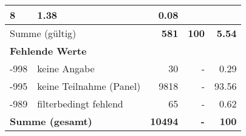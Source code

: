 \begin{longtable}{lXrrr}
       \num{8} &
       \num[round-mode=places,round-precision=2]{1,38} &
         \num[round-mode=places,round-precision=2]{0,08} \\
     \midrule
     \multicolumn{2}{l}{Summe (gültig)} &
       \textbf{\num{581}} &
     \textbf{100} &
       \textbf{\num[round-mode=places,round-precision=2]{5,54}} \\
     \multicolumn{5}{l}{\textbf{Fehlende Werte}}\\
       -998 &
       keine Angabe &
         \num{30} &
        - &
         \num[round-mode=places,round-precision=2]{0,29} \\
       -995 &
       keine Teilnahme (Panel) &
         \num{9818} &
        - &
         \num[round-mode=places,round-precision=2]{93,56} \\
       -989 &
       filterbedingt fehlend &
         \num{65} &
        - &
         \num[round-mode=places,round-precision=2]{0,62} \\
     \midrule
     \multicolumn{2}{l}{\textbf{Summe (gesamt)}} &
          \textbf{\num{10494}} &
        \textbf{-} &
        \textbf{100} \\
     \bottomrule
     \end{longtable}
     
